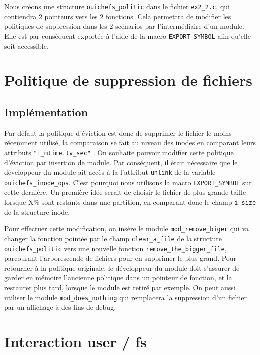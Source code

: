 \documentclass{article}
\begin{document}
	Nous créons une structure \verb|ouichefs_politic| dans le fichier \verb|ex2_2.c|, qui contiendra 2 pointeurs vers les 2 fonctions. Cela permettra de modifier les politiques de suppression dans les 2 scénarios par l'intermédiaire d'un module. Elle est par conséquent exportée à l'aide de la macro \verb|EXPORT_SYMBOL| afin qu'elle soit accessible.

	\section{Politique de suppression de fichiers}
	\subsection{Implémentation}
	Par défaut la politique d'éviction est donc de supprimer le fichier le moins récemment utilisé,  la comparaison se fait au niveau des inodes en comparant leurs attributs \verb|"i_mtime.tv_sec"| .\newline
	On souhaite pouvoir modifier cette politique d'éviction par insertion de module. Par conséquent, il était nécessaire que le développeur du module ait accès à la l'attribut \verb|unlink| de la variable \verb|ouichefs_inode_ops|. C'est pourquoi nous utilisons la macro \verb|EXPORT_SYMBOL| sur cette dernière.
	Un première idée serait de choisir le fichier de plus grande taille lorsque X\% sont restants dans une partition, en comparant donc le champ \verb|i_size| de la structure inode.\newline

	Pour effectuer cette modification, on insère le module \verb|mod_remove_biger| qui va changer la fonction pointée par le champ \verb|clear_a_file| de la structure \verb|ouichefs_politic| vers une nouvelle fonction \verb|remove_the_bigger_file|, parcourant l'arborescende de fichiers pour en supprimer le plus grand.\newline
	Pour retourner à la politique originale, le développeur du module doit s'assurer de garder en mémoire l'ancienne politique dans un pointeur de fonction, et la restaurer plus tard, lorsque le module est retiré par exemple.\newline
	On peut aussi utiliser le module \verb|mod_does_nothing| qui remplacera la suppression d'un fichier par un affichage à des fins de debug.

	\section{Interaction user / fs}
\end{document}

